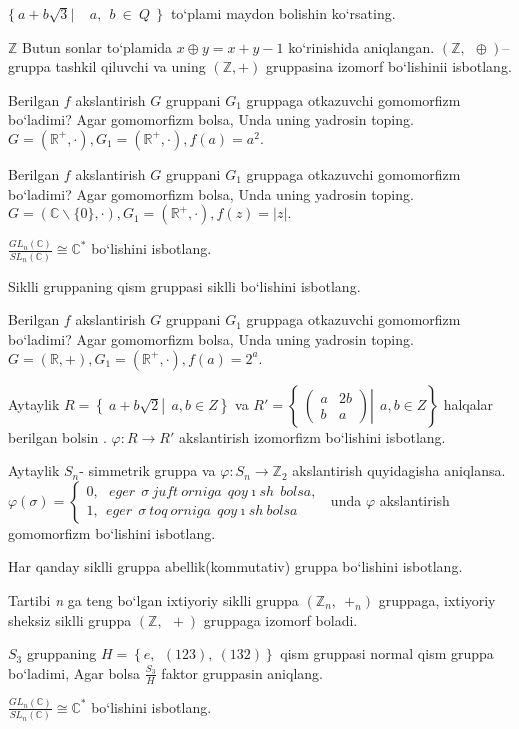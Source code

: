 \(\{\ a + b\sqrt{3}\left| \ \ \ \ \ a,\ \ b\  \in \ Q\ \ \} \right.\ \) to`plami maydon bo\textquotesingle lishin ko`rsating.

\(\mathbb{Z}\) Butun sonlar to`plamida \(x \oplus y = x + y - 1\) ko`rinishida aniqlangan. \((\mathbb{Z},\ \  \oplus )\)-- gruppa tashkil qiluvchi va uning \((\mathbb{Z}, + )\) gruppasina izomorf bo`lishinii isbotlang.

Berilgan \(f\) akslantirish \(G\) gruppani \(G_{1}\) gruppaga o\textquotesingle tkazuvchi gomomorfizm bo`ladimi? Agar gomomorfizm bolsa, Unda uning yadrosin toping. \(G = \left( \mathbb{R}^{+}, \cdot \right),G_{1} = \left( \mathbb{R}^{+}, \cdot \right),f(a) = a^{2}.\)

Berilgan \(f\) akslantirish \(G\) gruppani \(G_{1}\) gruppaga o\textquotesingle tkazuvchi gomomorfizm bo`ladimi? Agar gomomorfizm bolsa, Unda uning yadrosin toping.\(G = (\mathbb{C}\backslash\{ 0\}, \cdot ),G_{1} = \left( \mathbb{R}^{+}, \cdot \right),f(z) = |z|.\)

\(\frac{GL_{n}(\mathbb{C})}{SL_{n}(\mathbb{C})} \cong \mathbb{C}^{*}\) bo`lishini isbotlang.

Siklli gruppaning qism gruppasi siklli bo`lishini isbotlang.

Berilgan \(f\) akslantirish \(G\) gruppani \(G_{1}\) gruppaga o\textquotesingle tkazuvchi gomomorfizm bo`ladimi? Agar gomomorfizm bolsa, Unda uning yadrosin toping.\(G = (\mathbb{R}, + ),G_{1} = \left( \mathbb{R}^{+}, \cdot \right),f(a) = 2^{a}.\)

Aytaylik \(R = \left\{ \left. \ a + b\sqrt{2} \right|\ \ a,b \in Z \right\}\) va \(R' = \left\{ \left. \ \begin{pmatrix}
a & 2b \\
b & a
\end{pmatrix} \right|\ \ a,b \in Z \right\}\) halqalar berilgan bo\textquotesingle lsin . \(\varphi:R \rightarrow R'\) akslantirish izomorfizm bo`lishini isbotlang.

Aytaylik \(S_{n}\)- simmetrik gruppa va \(\varphi:S_{n} \rightarrow \mathbb{Z}_{2}\) akslantirish quyidagisha aniqlansa.\(\varphi(\sigma) = \left\{ \begin{matrix}
0,\ \ \ eger\ \ \sigma\ juft\ orniga\ \ qoy\imath sh\ \ bolsa, \\
1,\ \ eger\ \ \sigma\ toq\ orniga\ \ qoy\imath sh\ bolsa
\end{matrix} \right.\ \) unda \(\varphi\) akslantirish gomomorfizm bo`lishini isbotlang.

Har qanday siklli gruppa abellik(kommutativ) gruppa bo`lishini isbotlang.

Tartibi \emph{n} ga teng bo`lgan ixtiyoriy siklli gruppa \((\mathbb{Z}_{n},\ \  +_{n})\) gruppaga, ixtiyoriy sheksiz siklli gruppa \((\mathbb{Z},\ \  + )\) gruppaga izomorf boladi.

\(S_{3}\) gruppaning \(H = \left\{ e,\ \ (123),\ (132) \right\}\) qism gruppasi normal qism gruppa bo`ladimi, Agar bolsa \(\frac{S_{3}}{H}\) faktor gruppasin aniqlang.

\(\frac{GL_{n}(\mathbb{C})}{SL_{n}(\mathbb{C})} \cong \mathbb{C}^{*}\) bo`lishini isbotlang.
